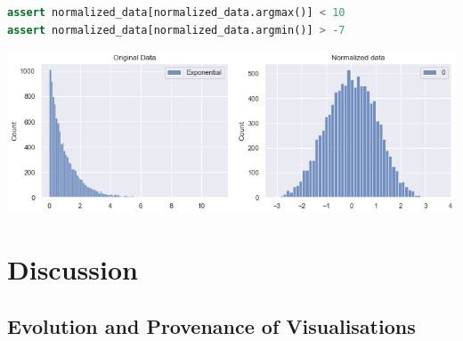 \documentclass[acmsmall,screen,review,anonymous]{acmart}
\begin{document}
\begin{minipage}{0.45\textwidth}
  \begin{lstlisting}[language=Python]
assert normalized_data[normalized_data.argmax()] < 10
assert normalized_data[normalized_data.argmin()] > -7
  \end{lstlisting}
  \label{lst:normal}
\end{minipage}
\hfill
\begin{minipage}{0.45\textwidth}
  \includegraphics[width=\linewidth]{../catalogue/select-65b.png}
  \label{fig:normal}
\end{minipage}

\section{Discussion}\label{sec:discuss}





\subsection{Evolution and Provenance of Visualisations}\label{sec:evolution}
\end{document}
